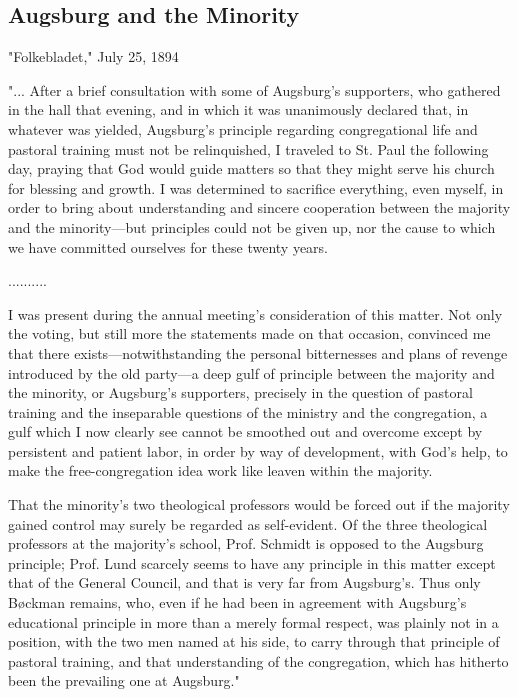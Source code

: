 
\subsection{Augsburg and the Minority}

"Folkebladet," July 25, 1894

"... After a brief consultation with some of Augsburg’s supporters, who gathered in the hall that evening, and in which it was unanimously declared that, in whatever was yielded, Augsburg’s principle regarding congregational life and pastoral training must not be relinquished, I traveled to St. Paul the following day, praying that God would guide matters so that they might serve his church for blessing and growth. I was determined to sacrifice everything, even myself, in order to bring about understanding and sincere cooperation between the majority and the minority—but principles could not be given up, nor the cause to which we have committed ourselves for these twenty years.

..........

I was present during the annual meeting’s consideration of this matter. Not only the voting, but still more the statements made on that occasion, convinced me that there exists—notwithstanding the personal bitternesses and plans of revenge introduced by the old party—a deep gulf of principle between the majority and the minority, or Augsburg’s supporters, precisely in the question of pastoral training and the inseparable questions of the ministry and the congregation, a gulf which I now clearly see cannot be smoothed out and overcome except by persistent and patient labor, in order by way of development, with God’s help, to make the free-congregation idea work like leaven within the majority.

That the minority’s two theological professors would be forced out if the majority gained control may surely be regarded as self-evident. Of the three theological professors at the majority’s school, Prof. Schmidt is opposed to the Augsburg principle; Prof. Lund scarcely seems to have any principle in this matter except that of the General Council, and that is very far from Augsburg’s. Thus only Bøckman remains, who, even if he had been in agreement with Augsburg’s educational principle in more than a merely formal respect, was plainly not in a position, with the two men named at his side, to carry through that principle of pastoral training, and that understanding of the congregation, which has hitherto been the prevailing one at Augsburg."

